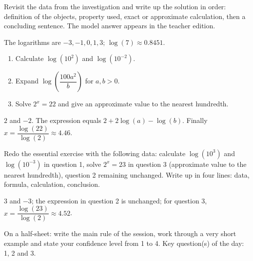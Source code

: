 \begin{example}
Revisit the data from the investigation and write up the solution in order: definition of the objects, property used, exact or approximate calculation, then a concluding sentence. The model answer appears in the teacher edition.
\end{example}
\begin{solution}The logarithms are $-3,-1,0,1,3$; $\log(7)\approx\num{0,8451}$.\end{solution}

\begin{exercise}[essential]
\begin{enumerate}\item Calculate $\log(10^2)$ and $\log(10^{-2})$.\item Expand $\log\!\left(\dfrac{100a^2}{b}\right)$ for $a,b>0$.\item Solve $2^x=22$ and give an approximate value to the nearest hundredth.\end{enumerate}
\end{exercise}
\begin{solution}$2$ and $-2$. The expression equals $2+2\log(a)-\log(b)$. Finally $x=\dfrac{\log(22)}{\log(2)}\approx\num{4,46}$.\end{solution}


\begin{homework}Redo the essential exercise with the following data: calculate $\log(10^{3})$ and $\log(10^{-3})$ in question 1, solve $2^x=23$ in question 3 (approximate value to the nearest hundredth), question 2 remaining unchanged. Write up in four lines: data, formula, calculation, conclusion.\end{homework}
\begin{solution}$3$ and $-3$; the expression in question 2 is unchanged; for question 3, $x=\dfrac{\log(23)}{\log(2)}\approx\num{4,52}$.\end{solution}

\begin{exitticket}[3 minutes]On a half-sheet: write the main rule of the session, work through a very short example and state your confidence level from 1 to 4. Key question(s) of the day: 1, 2 and 3.\end{exitticket}


